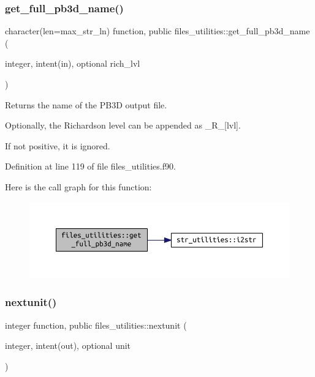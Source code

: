 \subsubsection{\texorpdfstring{get\+\_\+full\+\_\+pb3d\+\_\+name()}{get\_full\_pb3d\_name()}}
{\footnotesize\ttfamily character(len=max\+\_\+str\+\_\+ln) function, public files\+\_\+utilities\+::get\+\_\+full\+\_\+pb3d\+\_\+name (\begin{DoxyParamCaption}\item[{integer, intent(in), optional}]{rich\+\_\+lvl }\end{DoxyParamCaption})}



Returns the name of the P\+B3D output file. 

Optionally, the Richardson level can be appended as {\ttfamily \+\_\+\+R\+\_\+\mbox{[}lvl\mbox{]}}.

If not positive, it is ignored. 

Definition at line 119 of file files\+\_\+utilities.\+f90.

Here is the call graph for this function\+:\nopagebreak
\begin{figure}[H]
\begin{center}
\leavevmode
\includegraphics[width=350pt]{namespacefiles__utilities_a43f1c2b7e128b1b2cdbcdb8963daab0e_cgraph}
\end{center}
\end{figure}
\mbox{\label{namespacefiles__utilities_ac6066df405564ba2f5e3c4bba726c1f8}} 
\subsubsection{\texorpdfstring{nextunit()}{nextunit()}}
{\footnotesize\ttfamily integer function, public files\+\_\+utilities\+::nextunit (\begin{DoxyParamCaption}\item[{integer, intent(out), optional}]{unit }\end{DoxyParamCaption})}



